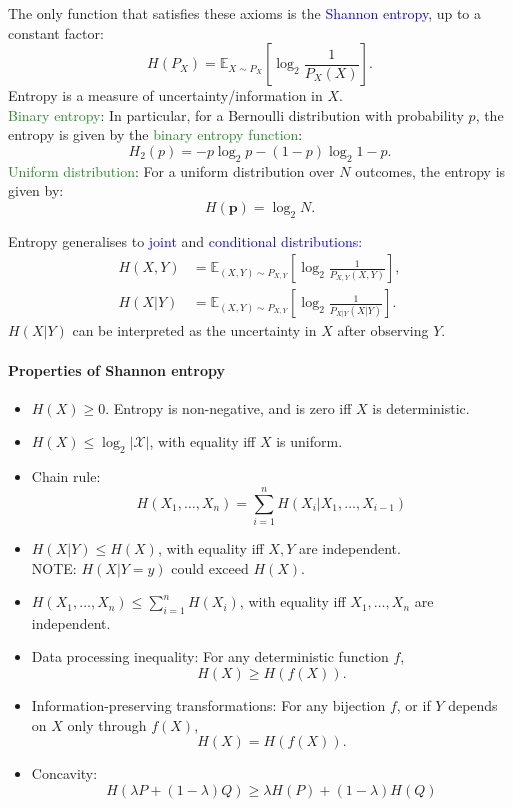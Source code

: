 The only function that satisfies these axioms is the \textcolor{Blue}{Shannon
entropy}, up to a constant factor:
\[H(P_X)=\mathbb{E}_{X\sim P_X}\left[ \log_2{\frac{1}{P_X(X)}} \right].\] 
Entropy is a measure of \textcolor{Bittersweet}{uncertainty/information} in
$X$.\\
\textcolor{ForestGreen}{Binary entropy}: In particular, for a
Bernoulli distribution with probability $p$, the entropy is given by the
\textcolor{ForestGreen}{binary entropy function}:
\[H_2(p)=-p\log_2{p}-(1-p)\log_2{1-p}.\]
\textcolor{ForestGreen}{Uniform distribution}: For a uniform distribution over
$N$ outcomes, the entropy is given by:
\[H(\mathbf{p})=\log_2{N}.\]

Entropy generalises to \textcolor{Blue}{joint} and \textcolor{Blue}{conditional
distributions:}
\begin{align*}
  H(X,Y) & =\mathbb{E}_{(X,Y)\sim P_{X,Y}}\left[ \log_2{\frac{1}{P_{X,Y}(X,Y)}} \right],\\
  H(X|Y) & =\mathbb{E}_{(X,Y)\sim P_{X,Y}}\left[ \log_2{\frac{1}{P_{X|Y}(X|Y)}} \right].
\end{align*}
$H(X|Y)$ can be interpreted as the \textcolor{Bittersweet}{uncertainty in $X$
after observing $Y$}.

\paragraph{Properties of Shannon entropy}
\begin{itemize}
  \item $H(X)\ge 0$. Entropy is \textcolor{Bittersweet}{non-negative}, and is
    zero iff $X$ is deterministic.
  \item $H(X)\le \log_2{|\mathcal{X}|}$, with equality iff $X$ is uniform.
  \item \textcolor{Bittersweet}{Chain rule}:
    \[H(X_1,\ldots,X_{n})=\sum_{i=1}^{n}
    H(X_i|X_1,\ldots,X_{i-1})\]
  \item $H(X|Y)\le H(X)$, with equality iff $X,Y$ are independent.\\
    \textcolor{Bittersweet}{NOTE:} $H(X|Y=y)$ could exceed $H(X)$.
  \item $H(X_1,\ldots,X_{n})\le \sum_{i=1}^{n} H(X_i)$, with equality iff
    $X_1,\ldots,X_{n}$ are independent.
  \item \textcolor{Bittersweet}{Data processing inequality}: For any
    deterministic function $f$,
    \[H(X)\ge H(f(X)).\]
  \item \textcolor{Bittersweet}{Information-preserving transformations}: For
    any bijection $f$, or if $Y$ depends on $X$ only through $f(X)$,
    \[H(X)=H(f(X)).\]
  \item \textcolor{Bittersweet}{Concavity}:
    \[H(\lambda P+(1-\lambda)Q)\ge \lambda H(P)+(1-\lambda)H(Q)\]
\end{itemize}

